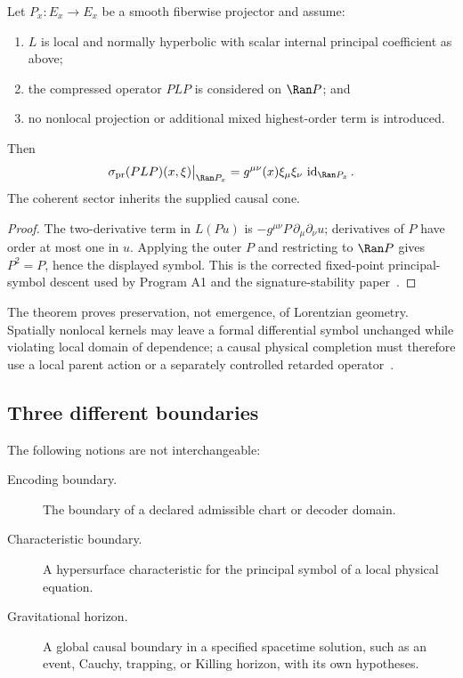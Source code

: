 \documentclass[11pt]{article}
\newcommand{\id}{\operatorname{id}}
\begin{document}
\begin{theorem}
\label{thm:compression}
Let $P_x:E_x\to E_x$ be a smooth fiberwise projector and assume:
\begin{enumerate}
\item $L$ is local and normally hyperbolic with scalar internal principal
coefficient as above;
\item the compressed operator $PLP$ is considered on $\Ran P$; and
\item no nonlocal projection or additional mixed highest-order term is
introduced.
\end{enumerate}
Then
\[
 \sigma_{\rm pr}(PLP)(x,\xi)\big|_{\Ran P_x}
 =g^{\mu\nu}(x)\xi_\mu\xi_\nu\,
 \id_{\Ran P_x}.
\]
The coherent sector inherits the supplied causal cone.
\end{theorem}

\begin{proof}
The two-derivative term in $L(Pu)$ is
$-g^{\mu\nu}P\,\partial_\mu\partial_\nu u$; derivatives of $P$ have order at
most one in $u$.  Applying the outer $P$ and restricting to $\Ran P$ gives
$P^2=P$, hence the displayed symbol.  This is the corrected fixed-point
principal-symbol descent used by Program A1 and the signature-stability
paper~\cite{FPVI,Signature}.
\end{proof}

The theorem proves preservation, not emergence, of Lorentzian geometry.
Spatially nonlocal kernels may leave a formal differential symbol unchanged
while violating local domain of dependence; a causal physical completion must
therefore use a local parent action or a separately controlled retarded
operator~\cite{FPVI}.

\subsection{Three different boundaries}

The following notions are not interchangeable:
\begin{description}
\item[Encoding boundary.]
The boundary of a declared admissible chart or decoder domain.

\item[Characteristic boundary.]
A hypersurface characteristic for the principal symbol of a local physical
equation.

\item[Gravitational horizon.]
A global causal boundary in a specified spacetime solution, such as an event,
Cauchy, trapping, or Killing horizon, with its own hypotheses.
\end{description}
\end{document}
